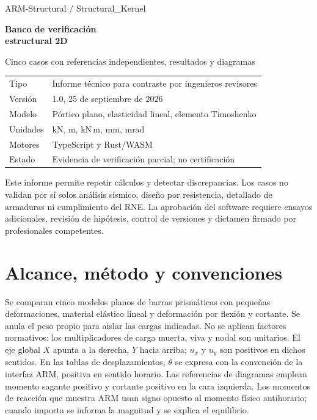\documentclass[11pt,a4paper]{article}
\begin{document}
\begin{titlepage}
\centering
\vspace*{22mm}
{\large ARM-Structural / Structural\_Kernel\par}
\vspace{13mm}
{\Huge\bfseries Banco de verificación\\[3mm]estructural 2D\par}
\vspace{7mm}
{\Large Cinco casos con referencias independientes, resultados y diagramas\par}
\vspace{19mm}
\begin{tabular}{@{}ll@{}}
Tipo & Informe técnico para contraste por ingenieros revisores\\
Versión & 1.0, 25 de septiembre de 2026\\
Modelo & Pórtico plano, elasticidad lineal, elemento Timoshenko\\
Unidades & kN, m, kN\,m, mm, mrad\\
Motores & TypeScript y Rust/WASM\\
Estado & Evidencia de verificación parcial; no certificación\\
\end{tabular}
\vfill
\begin{minipage}{0.86\textwidth}
\color{armgray}
Este informe permite repetir cálculos y detectar discrepancias. Los casos no
validan por sí solos análisis sísmico, diseño por resistencia, detallado de
armaduras ni cumplimiento del RNE. La aprobación del software requiere
ensayos adicionales, revisión de hipótesis, control de versiones y dictamen
firmado por profesionales competentes.
\end{minipage}
\end{titlepage}

\tableofcontents
\newpage

\section{Alcance, método y convenciones}
Se comparan cinco modelos planos de barras prismáticas con pequeñas
deformaciones, material elástico lineal y deformación por flexión y cortante.
Se anula el peso propio para aislar las cargas indicadas. No se aplican
factores normativos: los multiplicadores de carga muerta, viva y nodal son
unitarios. El eje global $X$ apunta a la derecha, $Y$ hacia arriba; $u_x$ y
$u_y$ son positivos en dichos sentidos. En las tablas de desplazamientos,
$\theta$ se expresa con la convención de la interfaz ARM, positiva en sentido
horario. Las referencias de diagramas emplean momento sagante positivo y
cortante positivo en la cara izquierda. Los momentos de reacción que muestra
ARM usan signo opuesto al momento físico antihorario; cuando importa se
informa la magnitud y se explica el equilibrio.
\end{document}
